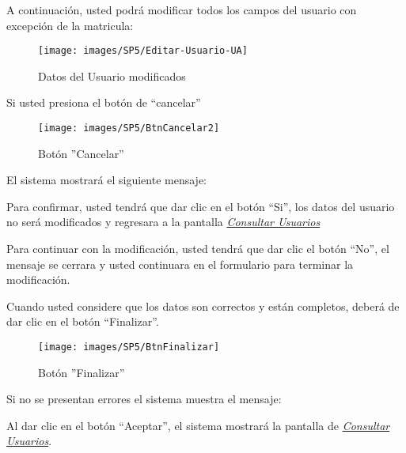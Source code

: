                 A continuación, usted podrá modificar todos los campos del usuario con excepción de la matricula:
                \begin{figure}[!hbtp]
                    \centering
                    \hypertarget{modif}{\texttt{[image: images/SP5/Editar-Usuario-UA]}}
                    \caption{Datos del Usuario modificados}
                    \label{modif}
                \end{figure}
                
                Si usted presiona el botón de “cancelar”
                
                \begin{figure}[!hbtp]
                    \centering
                    \hypertarget{cancel2}{\texttt{[image: images/SP5/BtnCancelar2]}}
                    \caption{Botón ''Cancelar''}
                    \label{cancel2}
                \end{figure}
                
                El sistema mostrará el siguiente mensaje:
                
                Para confirmar, usted tendrá que dar clic en el botón “Si”, los datos del usuario no será modificados  y regresara a la pantalla \hyperlink{consultarUs}{\textit{Consultar Usuarios}}
            
                Para continuar con la modificación, usted tendrá que  dar clic el botón “No”, el mensaje se cerrara y usted continuara en el formulario para terminar la modificación.
                
                Cuando usted considere que los datos son correctos y están completos, deberá de dar clic en el botón “Finalizar”.
                \begin{figure}[!hbtp]
                    \centering
                    \hypertarget{btnfin}{\texttt{[image: images/SP5/BtnFinalizar]}}
                    \caption{Botón ''Finalizar''}
                    \label{btnfin}
                \end{figure}
                
                Si no se presentan errores el sistema muestra el mensaje:
                
                Al dar clic en el botón “Aceptar”, el sistema mostrará la pantalla de \hyperlink{consultarUs}{\textit{Consultar Usuarios}}.
                
